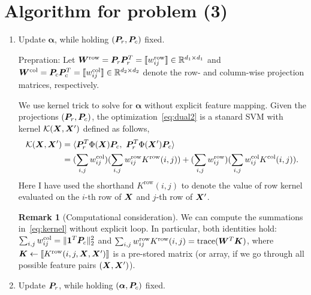 \documentclass[11pt]{article}
\theoremstyle{plain}
\theoremstyle{definition}
\newtheorem{rmk}{Remark}
\begin{document}
\section{Algorithm for problem (3)}
\begin{enumerate}
\item Update $\boldsymbol{\alpha}$, while holding $(\bm{P}_r, \bm{P}_c)$ fixed. 


Prepration: Let $\bm{W}^{\text{row}}=\bm{P}_r\bm{P}^T_r=\llbracket w^{\text{row}}_{ij} \rrbracket\in\mathbb{R}^{d_1\times d_1}$ and $\bm{W}^{\text{col}}=\bm{P}_c\bm{P}^T_c=\llbracket w^{\text{col}}_{ij} \rrbracket\in\mathbb{R}^{d_2\times d_2}$ denote the row- and column-wise projection matrices, respectively.

We use kernel trick to solve for $\boldsymbol{\alpha}$ without explicit feature mapping. Given the projections $(\bm{P}_r, \bm{P}_c)$, the optimization~\eqref{eq:dual2} is a stanard SVM with kernel $\mathcal{K}(\bm X,\bm X')$ defined as follows,
\begin{align}\label{eq:kernel}
\tK(\mX,\mX')&=\langle \mP^T_r\Phi(\mX)\mP_c,\ \mP^T_r\Phi(\mX')\mP_c\rangle\notag\\
&= (\sum_{i,j}w^{\text{col}}_{ij})( \sum_{i,j} w^{\text{row}}_{ij}K^{\text{row}}(i,j))+(\sum_{i,j}w^{\text{row}}_{ij})( \sum_{i,j} w^{\text{col}}_{ij}K^{\text{col}}(i,j)).
\end{align}
Here I have used the shorthand $K^{\text{row}}(i,j)$ to denote the value of row kernel evaluated on the $i$-th row of $\bm X$ and $j$-th row of $\bm X'$. 

\begin{rmk}[Computational consideration]
We can compute the summations in~\eqref{eq:kernel} without explicit loop. In particular, both identities hold: $\sum_{i,j}w^{\text{col}}_{ij}=\lVert\mathbf{1}^T\bm{P}_c\rVert_2^2$ and $\sum_{i,j} w^{\text{row}}_{ij}K^{\text{row}}(i,j)=\text{trace}(\bm{W}^T\bm K)$, where $\bm K\leftarrow \llbracket K^{\text{row}}(i,j,\bm X,\bm X') \rrbracket$ is a pre-stored matrix (or array, if we go through all possible feature pairs $(\bm X,\bm X')$).
\end{rmk}
\item Update $\bm{P}_r$, while holding $(\boldsymbol{\alpha}, \bm{P}_c)$ fixed.


\end{enumerate}
\end{document}
